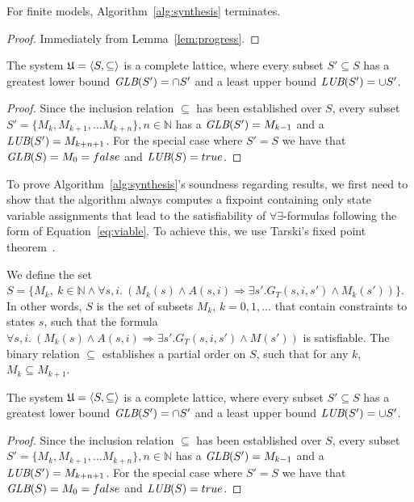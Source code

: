 \begin{theorem}
For finite models, Algorithm~\ref{alg:synthesis} terminates.
\end{theorem}
\begin{proof}
Immediately from Lemma~\ref{lem:progress}.
\end{proof}




\iffalse
The system $\mathfrak{U} = \langle S, \subseteq \rangle$ is a complete lattice, where every subset $S' \subseteq S$ has a greatest lower bound  $\textit {GLB}(S') = \cap S'$  and a least upper bound $\textit {LUB}(S') = \cup S'$.
\label{lem:altlattice}

\begin{proof}
Since the inclusion relation $\subseteq$ has been established over $S$, every subset $S' = \{M_k, M_{k+1}, \ldots M_{k+n}\}, n \in \mathbb{N}$ has a $\textit {GLB}(S') = M_{k-1}$ and a $\textit {LUB}(S') = M_{k+n+1}$. For the special case where $S' = S$ we have that $\textit {GLB}(S) = M_0 = false$ and $\textit {LUB}(S) = true$.
\end{proof}

\label{sec:soundness}
To prove Algorithm~\ref{alg:synthesis}'s soundness regarding results, we first need to show that the algorithm always computes a fixpoint containing only state variable assignments that lead to the satisfiability of $\forall\exists$-formulas following the form of Equation~\ref{eq:viable}. To achieve this, we
use Tarski's fixed point theorem~\cite{tarski1955lattice}.



We define the set $S = \{M_k, \ k \in \mathbb{N} \land \forall s, i. \ (M_k(s) \land A(s,i) \Rightarrow \exists s'. G_T(s,i,s') \land M_k(s'))\}$. In other words, $S$ is the set of subsets $M_k$, $k = 0, 1 , \ldots$ that contain constraints to states $s$, such that the formula $\forall s, i. \ (M_k(s) \land A(s,i) \Rightarrow \exists s'. G_T(s,i,s') \land M(s'))$ is satisfiable. The binary relation $\subseteq$ establishes a partial order on $S$, such that for any $k$, $M_k \subseteq M_{k+1}$.

\begin{lemma} The system $\mathfrak{U} = \langle S, \subseteq \rangle$ is a complete lattice, where every subset $S' \subseteq S$ has a greatest lower bound  $\textit {GLB}(S') = \cap S'$  and a least upper bound $\textit {LUB}(S') = \cup S'$.
\label{lem:altlattice}
\end{lemma}
\begin{proof}
Since the inclusion relation $\subseteq$ has been established over $S$, every subset $S' = \{M_k, M_{k+1}, \ldots M_{k+n}\}, n \in \mathbb{N}$ has a $\textit {GLB}(S') = M_{k-1}$ and a $\textit {LUB}(S') = M_{k+n+1}$. For the special case where $S' = S$ we have that $\textit {GLB}(S) = M_0 = false$ and $\textit {LUB}(S) = true$.
\end{proof}

